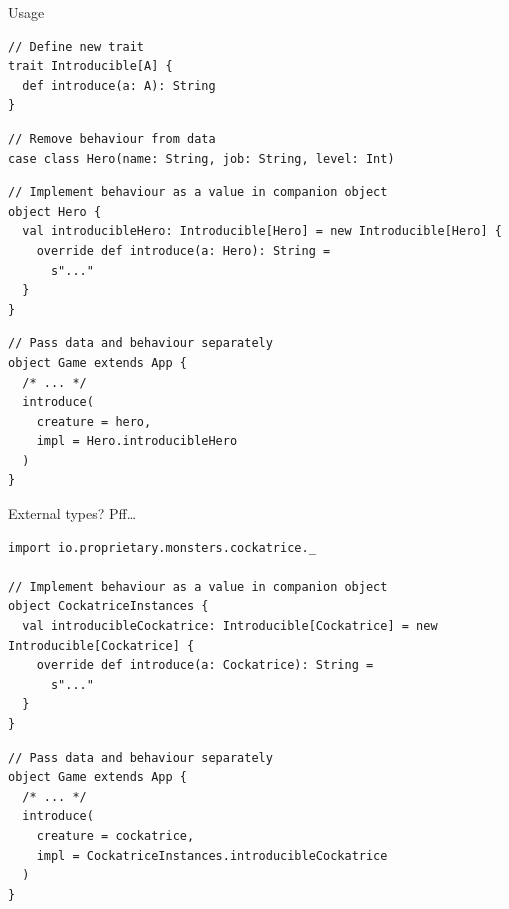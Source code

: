 \documentclass[presentation,aspectratio=169,smaller]{beamer}
\begin{document}
\begin{frame}[label={sec:org778f98f},fragile]{Usage}
 \begin{verbatim}
// Define new trait
trait Introducible[A] {
  def introduce(a: A): String
}
\end{verbatim}

\pause

\begin{verbatim}
// Remove behaviour from data
case class Hero(name: String, job: String, level: Int)
\end{verbatim}

\pause

\begin{verbatim}
// Implement behaviour as a value in companion object
object Hero {
  val introducibleHero: Introducible[Hero] = new Introducible[Hero] {
    override def introduce(a: Hero): String =
      s"..."
  }
}
\end{verbatim}

\pause

\begin{verbatim}
// Pass data and behaviour separately
object Game extends App {
  /* ... */
  introduce(
    creature = hero,
    impl = Hero.introducibleHero
  )
}
\end{verbatim}
\end{frame}

\begin{frame}[label={sec:org952fdc6},fragile]{External types? Pff\ldots{}}
 \begin{verbatim}
import io.proprietary.monsters.cockatrice._

// Implement behaviour as a value in companion object
object CockatriceInstances {
  val introducibleCockatrice: Introducible[Cockatrice] = new Introducible[Cockatrice] {
    override def introduce(a: Cockatrice): String =
      s"..."
  }
}
\end{verbatim}

\pause

\begin{verbatim}
// Pass data and behaviour separately
object Game extends App {
  /* ... */
  introduce(
    creature = cockatrice,
    impl = CockatriceInstances.introducibleCockatrice
  )
}
\end{verbatim}
\end{frame}
\end{document}
